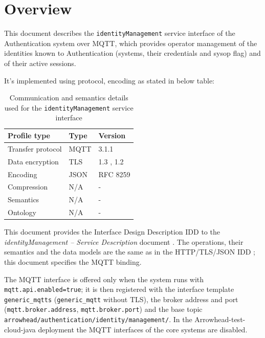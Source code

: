 \documentclass[a4paper]{arrowhead}
\begin{document}
\section{Overview}
\label{sec:overview}

This document describes the \texttt{identityManagement} service interface of the Authentication system over MQTT, which provides operator management of the identities known to Authentication (systems, their credentials and sysop flag) and of their active sessions.

It's implemented using protocol, encoding as stated in below table:
\begin{table}[ht!]
  \centering
  \begin{tabular}{|l|l|l|}
    \hline
    \rowcolor{gray!33} Profile type & Type & Version \\ \hline
    Transfer protocol & MQTT & 3.1.1 \cite{mqtt311} \\ \hline
    Data encryption & TLS & 1.3 \cite{rfc8446}, 1.2 \cite{rfc5246} \\ \hline
    Encoding & JSON & RFC 8259 \cite{rfc8259} \\ \hline
    Compression & N/A & - \\ \hline
    Semantics & N/A & - \\ \hline
    Ontology & N/A & - \\ \hline
  \end{tabular}
  \caption{Communication and semantics details used for the \texttt{identityManagement} service interface}
  \label{tab:comunication_semantics_profile}
\end{table}

This document provides the Interface Design Description IDD to the \textit{identityManagement -- Service Description} document \cite{auth-identityManagement-sd}.
The operations, their semantics and the data models are the same as in the HTTP/TLS/JSON IDD \cite{auth-identityManagement-http-idd}; this document specifies the MQTT binding.

The MQTT interface is offered only when the system runs with \texttt{mqtt.api.enabled=true}; it is then registered with the interface template \texttt{generic\_\allowbreak{}mqtts} (\texttt{generic\_\allowbreak{}mqtt} without TLS), the broker address and port (\texttt{mqtt.\allowbreak{}broker.\allowbreak{}address}, \texttt{mqtt.\allowbreak{}broker.\allowbreak{}port}) and the base topic \texttt{arrowhead/\allowbreak{}authentication/\allowbreak{}identity/\allowbreak{}management/\allowbreak{}}. In the Arrowhead-test-cloud-java deployment the MQTT interfaces of the core systems are disabled.
\end{document}
